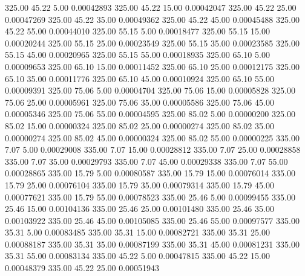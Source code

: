     325.00     45.22      5.00     0.00042893
    325.00     45.22     15.00     0.00042047
    325.00     45.22     25.00     0.00047269
    325.00     45.22     35.00     0.00049362
    325.00     45.22     45.00     0.00045488
    325.00     45.22     55.00     0.00044010
    325.00     55.15      5.00     0.00018477
    325.00     55.15     15.00     0.00020244
    325.00     55.15     25.00     0.00023549
    325.00     55.15     35.00     0.00023585
    325.00     55.15     45.00     0.00020965
    325.00     55.15     55.00     0.00018935
    325.00     65.10      5.00     0.00009653
    325.00     65.10     15.00     0.00011452
    325.00     65.10     25.00     0.00012175
    325.00     65.10     35.00     0.00011776
    325.00     65.10     45.00     0.00010924
    325.00     65.10     55.00     0.00009391
    325.00     75.06      5.00     0.00004704
    325.00     75.06     15.00     0.00005828
    325.00     75.06     25.00     0.00005961
    325.00     75.06     35.00     0.00005586
    325.00     75.06     45.00     0.00005346
    325.00     75.06     55.00     0.00004595
    325.00     85.02      5.00     0.00000200
    325.00     85.02     15.00     0.00000324
    325.00     85.02     25.00     0.00000274
    325.00     85.02     35.00     0.00000274
    325.00     85.02     45.00     0.00000324
    325.00     85.02     55.00     0.00000225
    335.00      7.07      5.00     0.00029008
    335.00      7.07     15.00     0.00028812
    335.00      7.07     25.00     0.00028858
    335.00      7.07     35.00     0.00029793
    335.00      7.07     45.00     0.00029338
    335.00      7.07     55.00     0.00028865
    335.00     15.79      5.00     0.00080587
    335.00     15.79     15.00     0.00076014
    335.00     15.79     25.00     0.00076104
    335.00     15.79     35.00     0.00079314
    335.00     15.79     45.00     0.00077621
    335.00     15.79     55.00     0.00078523
    335.00     25.46      5.00     0.00099455
    335.00     25.46     15.00     0.00104136
    335.00     25.46     25.00     0.00101480
    335.00     25.46     35.00     0.00103922
    335.00     25.46     45.00     0.00105085
    335.00     25.46     55.00     0.00097577
    335.00     35.31      5.00     0.00083485
    335.00     35.31     15.00     0.00082721
    335.00     35.31     25.00     0.00088187
    335.00     35.31     35.00     0.00087199
    335.00     35.31     45.00     0.00081231
    335.00     35.31     55.00     0.00083134
    335.00     45.22      5.00     0.00047815
    335.00     45.22     15.00     0.00048379
    335.00     45.22     25.00     0.00051943
